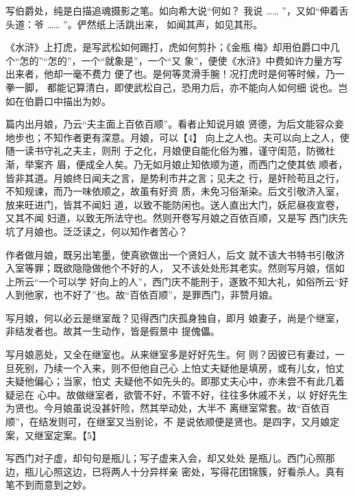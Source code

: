 \documentclass[UTF8,scheme=chinese,11pt,linespread=1.4]{ctexbook}
\makeatletter
\newenvironment{diben}[1]
  {\list{}{\listparindent 2em
    \itemindent\listparindent
    \rightmargin 0em  %
    \leftmargin 0em  %
    \parsep \z@ \@plus\p@}%
   \item\relax}
  {\endlist}
\makeatother
\begin{document}
\begin{diben}
描写伯爵处，纯是白描追魂摄影之笔。如向希大说“何如？
我说 …… ”，又如“伸着舌头道：爷 …… ”。俨然纸上活跳出来，
如闻其声，如见其形。

《水浒》上打虎，是写武松如何踢打，虎如何剪扑；《金瓶
梅》却用伯爵口中几个“怎的”“怎的”，一个“就象是”，一个“又
象”，便使《水浒》中费如许力量方写出来者，他却一毫不费力
便了也。是何等灵滑手腕！况打虎时是何等时候，乃一拳一脚，
都能记算清白，即使武松自己，恐用力后，亦不能向人如何细
说也。岂如在伯爵口中描出为妙。

篇内出月娘，乃云“夫主面上百依百顺”。看者止知说月娘
贤德，为后文能容众妾地步也；不知作者更有深意。月娘，可以【4】
向上之人也。夫可以向上之人，使随一读书守礼之夫主，则刑
于之化，月娘便自能化俗为雅，谨守闺范，防微杜渐，举案齐
眉，便成全人矣。乃无如月娘止知依顺为道，而西门之使其依
顺者，皆非其道。月娘终日闻夫之言，是势利市井之言；见夫之
行，是奸险苟且之行，不知规谏，而乃一味依顺之，故虽有好资
质，未免习俗渐染。后文引敬济入室，放来旺进门，皆其不闻妇
道，以致不能防闲也。送人直出大门，妖尼昼夜宣卷，又其不闻
妇道，以致无所法守也。然则开卷写月娘之百依百顺，又是写
西门庆先坑了月娘也。泛泛读之，何以知作者苦心？

作者做月娘，既另出笔墨，使真欲做出一个贤妇人，后文
就不该大书特书引敬济入室等罪；既欲隐隐做他个不好的人，
又不该处处形其老实。然则写月娘，信如上所云“一个可以学
好向上的人”，西门庆不能刑于，遂致不知大礼，如俗所云“好
人到他家，也不好了”也。故“百依百顺”，是罪西门，非赞月娘。

写月娘，何以必云是继室哉？见得西门庆孤身独自，即月
娘妻子，尚是个继室，非结发者也。故其一生动作，皆是假景中
提傀儡。

写月娘恶处，又全在继室也。从来继室多是好好先生。何
则？因彼已有妻过，一旦死别，乃续一个入来，则不但他自己心
上怕丈夫疑他是填房，或有儿女，怕丈夫疑他偏心；当家，怕丈
夫疑他不如先头的。即那丈夫心中，亦未尝不有此几着疑忌在
心中。故做继室者，欲管不好，不管不好，往往多休戚不关，以
好好先生为贤也。今月娘虽说没甚奸险，然其举动处，大半不
离继室常套。故“百依百顺”，在结发则可，在继室又当别论，不
是说依顺便是贤也。是四字，又月娘定案，又继室定案。【5】

写西门对子虚，却句句是瓶儿；写子虚来入会，却又处处
是瓶儿。西门心照那边，瓶儿心照这边，已将两人十分异样亲
密处，写得花团锦簇，好看杀人。真有笔不到而意到之妙。


\end{diben}
\end{document}
